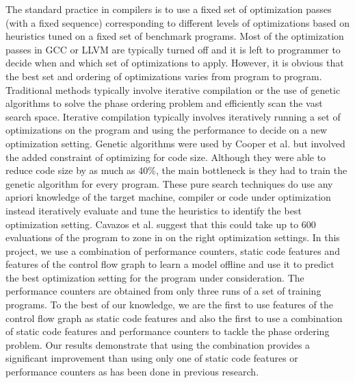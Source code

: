 \documentclass[10pt]{sigplanconf}
\begin{document}
The standard practice in compilers is to use a fixed set of optimization passes (with a fixed sequence) corresponding to different levels of optimizations based on heuristics tuned on a fixed set of benchmark programs. Most of the optimization passes in GCC or LLVM are typically turned off and it is left to programmer to decide when and which set of optimizations to apply. However, it is obvious that the best set and ordering of optimizations varies from program to program. Traditional methods typically involve iterative compilation \cite{c1} or the use of genetic algorithms \cite{c2} to solve the phase ordering problem and efficiently scan the vast search space. Iterative compilation typically involves iteratively running  a set of optimizations on the program and using the performance to decide on a new optimization setting. Genetic algorithms were used by Cooper et al. \cite{c2} but involved the added constraint of optimizing for code size. Although they were able to reduce code size by as much as 40\%, the main bottleneck is they had to train the genetic algorithm for every program. These pure search techniques do use any apriori knowledge of the target machine, compiler or code under optimization instead iteratively evaluate and tune the heuristics to identify the best optimization setting. Cavazos et al. \cite{c7} suggest that this could take up to 600 evaluations of the program to zone in on the right optimization settings. In this project, we use a combination of performance counters, static code features and features of the control flow graph to learn a model offline and use it to predict the best optimization setting for the program under consideration. The performance counters are obtained from only three runs of a set of training programs. To the best of our knowledge, we are the first to use features of the control flow graph as static code features and also the first to use a combination of static code features and performance counters to tackle the phase ordering problem. Our results demonstrate that using the combination provides a significant improvement than using only one of static code features or performance counters as has been done in previous research.          
\end{document}
